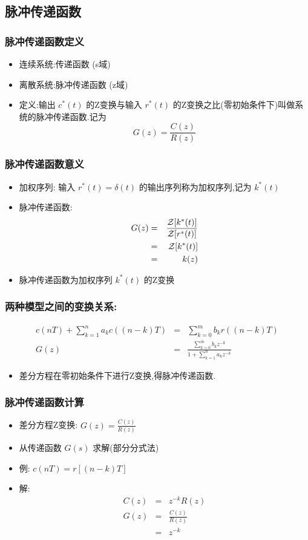 \documentclass[table]{article}
\begin{document}
\subsection{脉冲传递函数}
\label{sec-4-2}
\begin{frame}
\frametitle{脉冲传递函数定义}
\label{sec-4-2-1}

\begin{itemize}
\item 连续系统:传递函数 (s域)
\item 离散系统:脉冲传递函数 (z域)
\item <2->定义:输出  $c^*(t)$   的Z变换与输入  $r^*(t)$  的Z变换之比(零初始条件下)叫做系统的脉冲传递函数.记为 
	 \[G(z)=\frac{C(z)}{R(z)}\]
\end{itemize}
\end{frame}
\begin{frame}
\frametitle{脉冲传递函数意义}
\label{sec-4-2-2}

\begin{itemize}
\item 加权序列: 输入  $r^*(t)=\delta(t)$  的输出序列称为加权序列,记为  $k^*(t)$
\item <2->脉冲传递函数: 
      \begin{eqnarray*}
      G(z) &=& \frac{{\cal Z}[k^*(t)]}{{\cal Z}[r^*(t)]} \\
      &=& {\cal Z}[k^*(t)]\\
      &=& k(z)
      \end{eqnarray*}
\item <3-> 脉冲传递函数为加权序列  $k^*(t)$  的Z变换
\end{itemize}
\end{frame}
\begin{frame}
\frametitle{两种模型之间的变换关系:}
\label{sec-4-2-3}

      \begin{eqnarray*}
      c(nT)+\sum_{k=1}^n a_k c((n-k)T) &=& \sum_{k=0}^m b_k r((n-k)T) \\
      G(z) &=& \frac{\sum_{k=0}^{m}b_k z^{-k}}{1+\sum_{k=1}^n a_k z^{-k}}
      \end{eqnarray*}
\begin{itemize}
\item <2-> 差分方程在零初始条件下进行Z变换,得脉冲传递函数.
\end{itemize}
\end{frame}
\begin{frame}
\frametitle{脉冲传递函数计算}
\label{sec-4-2-4}

\begin{itemize}
\item 差分方程Z变换:  $G(z)=\frac{C(z)}{R(z)}$
\item 从传递函数  $G(s)$  求解(部分分式法)
\item <2->例:  $c(nT)=r[(n-k)T]$
\item <3->解:
       \begin{eqnarray*}
       C(z) &=& z^{-k}R(z) \\
       G(z) &=& \frac{C(z)}{R(z)} \\
         &=& z^{-k}
       \end{eqnarray*}
\end{itemize}
\end{frame}
\end{document}
